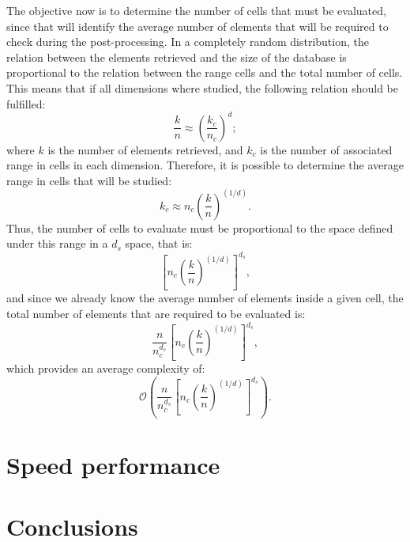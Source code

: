 \documentclass[preprint,12pt]{elsarticle}
\begin{document}
The objective now is to determine the number of cells that must be evaluated, since that will identify the average number of elements that will be required to check during the post-processing. In a completely random distribution, the relation between the elements retrieved and the size of the database is proportional to the relation between the range cells and the total number of cells. This means that if all dimensions where studied, the following relation should be fulfilled:
\begin{equation}
\displaystyle\frac{k}{n}\approx\left(\frac{k_c}{n_c}\right)^d;
\end{equation}
where $k$ is the number of elements retrieved, and $k_c$ is the number of associated range in cells in each dimension. Therefore, it is possible to determine the average range in cells that will be studied:
\begin{equation}
k_c\approx n_c\left(\displaystyle\frac{k}{n}\right)^{(1/d)}.
\end{equation}
Thus, the number of cells to evaluate must be proportional to the space defined under this range in a $d_s$ space, that is:
\begin{equation}
\left[n_c\left(\displaystyle\frac{k}{n}\right)^{(1/d)}\right]^{d_s},
\end{equation}
and since we already know the average number of elements inside a given cell, the total number of elements that are required to be evaluated is:
\begin{equation}
\displaystyle\frac{n}{n_c^{d_s}}\left[n_c\left(\displaystyle\frac{k}{n}\right)^{(1/d)}\right]^{d_s},
\end{equation}
which provides an average complexity of:
\begin{equation}
\mathcal{O}\left(\displaystyle\frac{n}{n_c^{d_s}}\left[n_c\left(\displaystyle\frac{k}{n}\right)^{(1/d)}\right]^{d_s}\right).
\end{equation}


\section{Speed performance}
\label{sec:performance}

\section{Conclusions}
\label{sec:conclusions}
\end{document}
